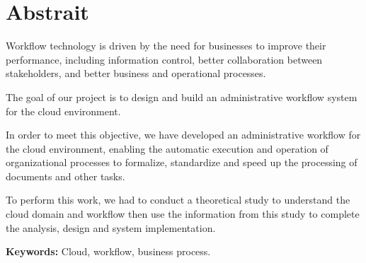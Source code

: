 \chapter*{Abstrait}

Workflow technology is driven by the need for businesses to improve their performance, including information control, better collaboration between stakeholders, and better business and operational processes.

The goal of our project is to design and build an administrative workflow system for the cloud environment.


In order to meet this objective, we have developed an administrative workflow for the cloud environment, enabling the automatic execution and operation of organizational processes to formalize, standardize and speed up the processing of documents and other tasks.

To perform this work, we had to conduct a theoretical study to understand the cloud domain and workflow then use the information from this study to complete the analysis, design and system implementation.


\textbf{Keywords:} Cloud, workflow, business process.
 